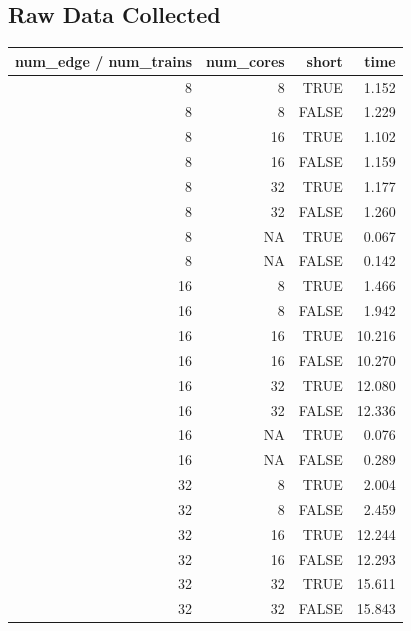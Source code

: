 \documentclass[a4paper,12pt]{article}
\begin{document}
\subsection{Raw Data Collected}
\begin{center}
	\begin{tabular}{r r r | r}
		num\_edge / num\_trains & num\_cores & short & time    \\
		\hline
		8                       & 8          & TRUE  & 1.152   \\
		8                       & 8          & FALSE & 1.229   \\
		8                       & 16         & TRUE  & 1.102   \\
		8                       & 16         & FALSE & 1.159   \\
		8                       & 32         & TRUE  & 1.177   \\
		8                       & 32         & FALSE & 1.260   \\
		8                       & NA         & TRUE  & 0.067   \\
		8                       & NA         & FALSE & 0.142   \\
		\hline
		16                      & 8          & TRUE  & 1.466   \\
		16                      & 8          & FALSE & 1.942   \\
		16                      & 16         & TRUE  & 10.216  \\
		16                      & 16         & FALSE & 10.270  \\
		16                      & 32         & TRUE  & 12.080  \\
		16                      & 32         & FALSE & 12.336  \\
		16                      & NA         & TRUE  & 0.076   \\
		16                      & NA         & FALSE & 0.289   \\
		\hline
		32                      & 8          & TRUE  & 2.004   \\
		32                      & 8          & FALSE & 2.459   \\
		32                      & 16         & TRUE  & 12.244  \\
		32                      & 16         & FALSE & 12.293  \\
		32                      & 32         & TRUE  & 15.611  \\
		32                      & 32         & FALSE & 15.843  \\

\end{tabular}
\end{center}
\end{document}

